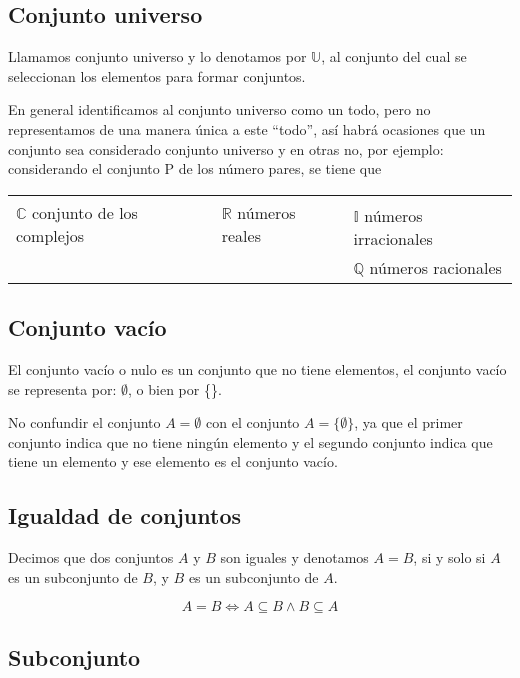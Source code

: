 \subsection*{Conjunto universo}
Llamamos conjunto universo y lo denotamos por $\mathbb U$, al conjunto del cual se
seleccionan los elementos para formar conjuntos.

En general identificamos al conjunto universo como un todo, pero no
representamos de una manera única a este “todo”, así habrá ocasiones que un
conjunto sea considerado conjunto universo y en otras no, por ejemplo:
considerando el conjunto P de los número pares, se tiene que

\begin{tabular}{ |l|l|l| }
    
\multirow{2}{4em}{$\mathbb C$ conjunto de los complejos} & \multirow{2}{4em}{$\mathbb R$ números reales} \\
    & & $\mathbb I$ números irracionales \\
    & & $\mathbb Q$ números racionales
\end{tabular}



\subsection*{Conjunto vacío}

El conjunto vacío o nulo es un conjunto que no tiene elementos, el conjunto
vacío se representa por: $\emptyset$, o bien por \{\}.

No confundir el conjunto $A = \emptyset $ con el conjunto $ A = \{\emptyset\} $,
ya que el primer conjunto indica que no tiene ningún elemento y el segundo
conjunto indica que tiene un elemento y ese elemento es el conjunto vacío.

\subsection*{Igualdad de conjuntos}

Decimos que dos conjuntos $A$ y $B$ son iguales y denotamos $A=B$, si y solo si
$A$ es un subconjunto de $B$, y $B$ es un subconjunto de $A$.

\begin{equation}
    A=B \iff A \subseteq B \land B \subseteq A
\end{equation}

\subsection*{Subconjunto}

